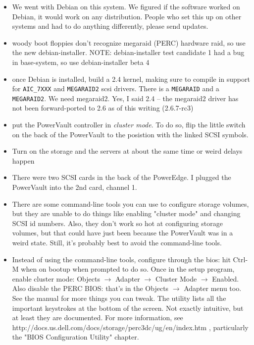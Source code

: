 \documentclass[11pt]{article}
\begin{document}
\begin{itemize}
\item We went with Debian on this system.  We figured if the software worked
  on Debian, it would work on any distribution.  People who set this up
  on other systems and had to do anything differently, please send
  updates.

\item woody boot floppies don't recognize megaraid (PERC) hardware raid, so
  use the new debian-installer.  NOTE: debian-installer test candidate 1
  had a bug in base-system, so use debian-installer beta 4

\item once Debian is installed, build a 2.4 kernel, making sure to compile
  in support for \texttt{AIC\_7XXX} and \texttt{MEGARAID2} scsi drivers.
  There is a \texttt{MEGARAID} and a \texttt{MEGARAID2}.  We need
  megaraid2.  Yes, I said 2.4 -- the megaraid2 driver has not been
  forward-ported to 2.6 as of this writing (2.6.7-rc3)

\item put the PowerVault controller in \emph{cluster mode}.  To do so,
  flip the little switch on the back of the PowerVault to the posistion
  with the linked SCSI symbols.  

\item Turn on the storage and the servers at about the same time or
  weird delays happen

\item There were two SCSI cards in the back of the PowerEdge. I plugged the
  PowerVault into the 2nd card, channel 1.

\item There are some command-line tools you can use to configure storage
  volumes, but they are unable to do things like enabling "cluster mode"
  and changing SCSI id numbers.  Also, they don't work so hot at
  configuring storage volumes, but that could have just been because the
  PowerVault was in a weird state.  Still, it's probably best to avoid
  the command-line tools.

\item Instead of using the command-line tools, configure through the
  bios: hit Ctrl-M when on bootup when prompted to do so.  Once in the
  setup program, enable cluster mode:
  Objects $\rightarrow$ Adapter $\rightarrow$ Cluster Mode $\rightarrow$
  Enabled.  Also disable the PERC BIOS: that's in the Objects
  $\rightarrow$ Adapter menu too.  See the manual for more things you
  can tweak.  The utility lists all the important keystrokes at the
  bottom of the screen.  Not exactly intuitive, but at least they are
  documented. For more information, see
  http://docs.us.dell.com/docs/storage/perc3dc/ug/en/index.htm ,
  particularly the "BIOS Configuration Utility" chapter.


\end{itemize}
\end{document}
